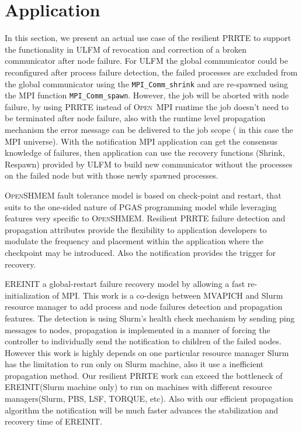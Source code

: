 \documentclass[sigconf]{acmart}
\newcommand{\mpifunc}[1]{\lstinline"MPI_#1"\xspace}
\newcommand{\prrte}[0]{\textsc{PRRTE}\xspace}
\newcommand{\ompi}[0]{\textsc{Open~MPI}\xspace}
\newcommand{\ulfm}[0]{\textsc{ULFM}\xspace}
\newcommand{\mpi}[0]{\textsc{MPI}\xspace}
\newcommand{\oshmem}[0]{\textsc{OpenSHMEM}\xspace}
\begin{document}
\section{Application}\label{sec:motivation}
In this section, we present an actual use case of the resilient \prrte to support the functionality in \ulfm of revocation and correction of a broken communicator after node failure. For \ulfm the global communicator could be reconfigured after process failure detection, the failed processes are excluded from the global communicator using the \mpifunc{Comm_shrink} and are re-spawned using the \mpi function \mpifunc{Comm_spawn}. However, the job will be aborted with node failure, by using \prrte instead of \ompi runtime the job doesn't need to be terminated after node failure, also with the runtime level propagation mechanism the error message can be delivered to the job scope ( in this case the \mpi universe). With the notification \mpi application can get the consensus knowledge of failures, then application can use the recovery functions (Shrink, Respawn) provided by \ulfm to build new communicator without the processes on the failed node but with those newly spawned processes. 

\oshmem fault tolerance model is based on check-point and restart, that suits to the one-sided nature of PGAS programming model while leveraging features very specific to \oshmem. Resilient \prrte failure detection and propagation attributes provide the flexibility to application developers to modulate the frequency and placement within the application where the checkpoint may be introduced. Also the notification provides the trigger for recovery. 

EREINIT a global-restart failure recovery model by allowing a fast re-initialization of \mpi. This work is a co-design between MVAPICH and Slurm resource manager to add process and node failures detection and propagation features. The detection is using Slurm's health check mechanism by sending ping messages to nodes, propagation is implemented in a manner of forcing the controller to individually send the notification to children of the failed nodes. However this work is highly depends on one particular resource manager Slurm has the limitation to run only on Slurm machine, also it use a inefficient propagation method. Our resilient \prrte work can exceed the bottleneck of EREINIT(Slurm machine only) to run on machines with different resource managers(Slurm, PBS, LSF, TORQUE, etc). Also with our efficient propagation algorithm the notification will be much faster advances the stabilization and recovery time of EREINIT.
\end{document}

